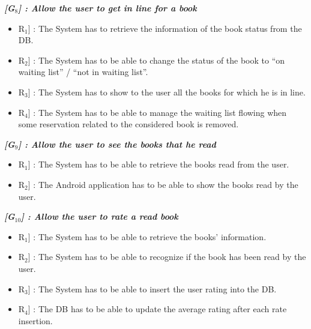 \vspace{0.5cm}
\noindent
\emph{\textbf{[G$_{8}$] : Allow the user to get in line for a book}}
\begin{itemize}
	\setlength{\leftskip}{0.5cm}
	\item \lbrack R$_{1}$] : The System has to retrieve the information of the book status from the DB.
	\item \lbrack R$_{2}$] : The System has to be able to change the status of the book to “on waiting list” / “not in waiting list”.
	\item \lbrack R$_{3}$] : The System has to show to the user all the books for which he is in line.
	\item \lbrack R$_{4}$] : The System has to be able to manage the waiting list flowing when some reservation related to the considered book is removed.
\end{itemize}

\vspace{0.5cm}
\noindent
\emph{\textbf{[G$_{9}$] : Allow the user to see the books that he read}}
\begin{itemize}
	\setlength{\leftskip}{0.5cm}
	\item \lbrack R$_{1}$] : The System has to be able to retrieve the books read from the user.
	\item \lbrack R$_{2}$] : The Android application has to be able to show the books read by the user.
\end{itemize}

\vspace{0.5cm}
\noindent
\emph{\textbf{[G$_{10}$] : Allow the user to rate a read book}}
\begin{itemize}
	\setlength{\leftskip}{0.5cm}
	\item \lbrack R$_{1}$] : The System has to be able to retrieve the books’ information.
	\item \lbrack R$_{2}$] : The System has to be able to recognize if the book has been read by the user.
	\item \lbrack R$_{3}$] : The System has to be able to insert the user rating into the DB.
	\item \lbrack R$_{4}$] : The DB has to be able to update the average rating after each rate insertion.
\end{itemize}

